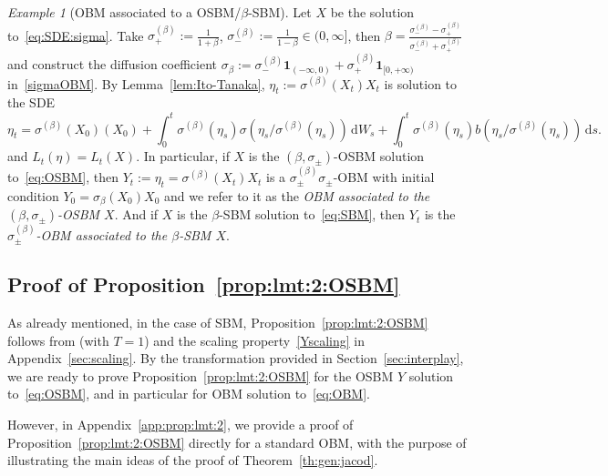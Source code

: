 \documentclass[12pt]{article}
\numberwithin{equation}{section}
\theoremstyle{definition}
\theoremstyle{remark}
\newtheorem{example}{Example}
\newcommand{\ind}[1]{\mathbf{1}_{#1}}
\newcommand{\vd}{\,\mathrm{d}}
\begin{document}
\begin{example}[OBM associated to a OSBM/$\beta$-SBM]
\label{exa:SBM-OBM}
Let $X$ be the solution to~\eqref{eq:SDE:sigma}. 
Take 
$\sigma_+^{(\beta)}:=\frac{1}{1 + \beta}$, 
$\sigma_-^{(\beta)}:=\frac{1}{1 - \beta}\in (0,\infty]$, 
then $\beta=\frac{\sigma_-^{(\beta)}-\sigma_+^{(\beta)}}{\sigma_-^{(\beta)}+\sigma_+^{(\beta)}}$  
and construct the diffusion coefficient 
${\sigma_{\beta}}:=\sigma_-^{(\beta)} \ind{(-\infty,0)}+\sigma_+^{(\beta)} \ind{[0,+\infty)}$ in~\eqref{sigmaOBM}. 
By Lemma~\ref{lem:Ito-Tanaka}, 
$\eta_t:=\sigma^{(\beta)}(X_t)X_t$ is solution to the SDE
\begin{equation}
	\eta_t = \sigma^{(\beta)}(X_0) (X_0) 
	+ \int_0^t \sigma^{(\beta)}(\eta_s) \sigma(\eta_s/\sigma^{(\beta)}(\eta_s)) \vd W_s 
	+ \int_0^t \sigma^{(\beta)}(\eta_s) b(\eta_s/\sigma^{(\beta)}(\eta_s)) \vd s .
\end{equation}
and
$
	L_t(\eta) = L_t(X).
$
In particular, if $X$ is the $(\beta,\sigma_\pm)$-OSBM solution to~\eqref{eq:OSBM},
then $Y_t:=\eta_t=\sigma^{(\beta)}(X_t) X_t$ is a 
$\sigma_\pm^{(\beta)}\sigma_\pm$-OBM with initial condition $Y_0={\sigma_{\beta}}(X_0) X_0$ and we refer to it as the {\em OBM associated to the $(\beta,\sigma_\pm)$-OSBM $X$\/}.
And if $X$ is the $\beta$-SBM solution to~\eqref{eq:SBM},
then $Y_t$ is the {\em $\sigma_\pm^{(\beta)}$-OBM associated to the $\beta$-SBM $X$\/}.
\end{example}



\subsection{Proof of Proposition~\ref{prop:lmt:2:OSBM}}


As already mentioned, in the case of SBM, Proposition~\ref{prop:lmt:2:OSBM} follows from \cite[Proposition~2]{lmt1} (with $T=1$) and the scaling property~\eqref{Yscaling} in Appendix~\ref{sec:scaling}.
By the transformation provided in Section~\ref{sec:interplay}, we are ready to prove %
Proposition~\ref{prop:lmt:2:OSBM} for the OSBM $Y$ solution to~\eqref{eq:OSBM}, and in particular for OBM solution to~\eqref{eq:OBM}.

However, in Appendix~\ref{app:prop:lmt:2}, we provide a proof of Proposition~\ref{prop:lmt:2:OSBM} directly for a standard OBM, with the purpose of illustrating the main ideas of the proof of Theorem~\ref{th:gen:jacod}.
\end{document}
